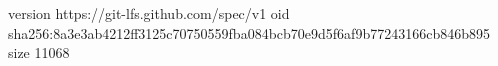 version https://git-lfs.github.com/spec/v1
oid sha256:8a3e3ab4212ff3125c70750559fba084bcb70e9d5f6af9b77243166cb846b895
size 11068
